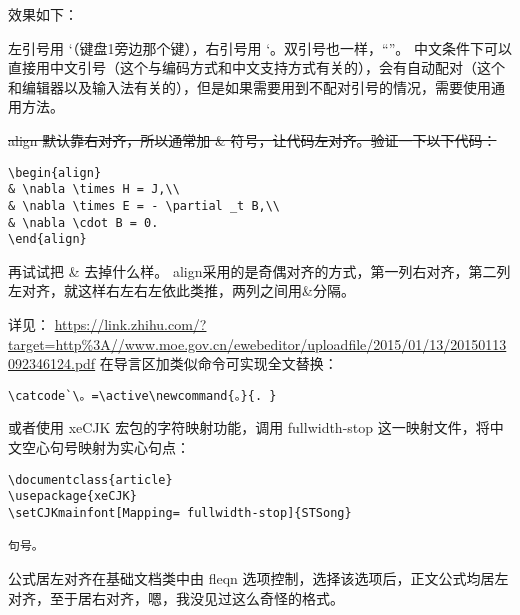 效果如下：



左引号用 `（键盘1旁边那个键），右引号用 `。双引号也一样，``''。
中文条件下可以直接用中文引号（这个与编码方式和中文支持方式有关的），会有自动配对（这个和编辑器以及输入法有关的），但是如果需要用到不配对引号的情况，需要使用通用方法。



\sout{align 默认靠右对齐，所以通常加 \&
符号，让代码左对齐。验证一下以下代码：}

\begin{verbatim}
\begin{align}
& \nabla \times H = J,\\
& \nabla \times E = - \partial _t B,\\
& \nabla \cdot B = 0.
\end{align}
\end{verbatim}

再试试把 \& 去掉什么样。
align采用的是奇偶对齐的方式，第一列右对齐，第二列左对齐，就这样右左右左依此类推，两列之间用\&分隔。



详见：
\url{https://link.zhihu.com/?target=http\%3A//www.moe.gov.cn/ewebeditor/uploadfile/2015/01/13/20150113092346124.pdf}
在导言区加类似命令可实现全文替换：

\begin{verbatim}
\catcode`\。=\active\newcommand{。}{. }
\end{verbatim}

或者使用 xeCJK 宏包的字符映射功能，调用 fullwidth-stop
这一映射文件，将中文空心句号映射为实心句点：

\begin{verbatim}
\documentclass{article}
\usepackage{xeCJK}
\setCJKmainfont[Mapping= fullwidth-stop]{STSong}

句号。

\end{verbatim}



公式居左对齐在基础文档类中由 fleqn
选项控制，选择该选项后，正文公式均居左对齐，至于居右对齐，嗯，我没见过这么奇怪的格式。


